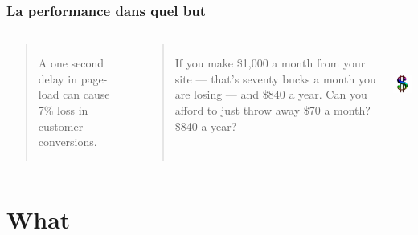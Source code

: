 \documentclass{beamer}
\begin{document}
\begin{frame}
  \frametitle{La performance dans quel but}

  \vfill

\begin{columns}[c]

\begin{quote}
A one second delay in page-load can cause 7\% loss in customer conversions.
\end{quote}

\begin{quotation}
If you make \$1,000 a month from your site — that’s seventy bucks a month
you are losing — and \$840 a year. Can you afford to just throw away \$70 a
month? \$840 a year?
\end{quotation}

\begin{center}
  \includegraphics[height=7em]{Dollar-sign.jpg}
\end{center}
\end{columns}
\end{frame}

\section{What}
\end{document}
